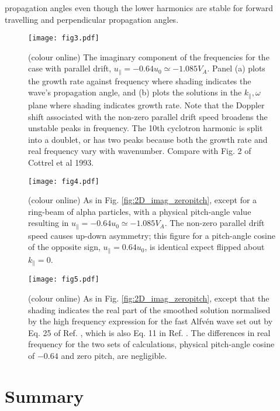 \documentclass[12pt]{iopart}
\begin{document}
propagation angles even though the lower harmonics are stable for forward travelling and perpendicular propagation angles.

\begin{figure}[ht!]
    \raggedleft
\texttt{[image: fig3.pdf]}
    \caption{(colour online) The imaginary component of the frequencies for the case with parallel drift, $u_{\parallel} = -0.64 u_0 \simeq -1.085 V_A$. Panel (a) plots the growth rate against frequency where shading indicates the wave's propagation angle, and (b) plots the solutions in the $k_\parallel, \omega$ plane where shading indicates growth rate. Note that the Doppler shift associated with the non-zero parallel drift speed broadens the unstable peaks in frequency. The 10th cyclotron harmonic is split into a doublet, or has two peaks because both the growth rate and real frequency vary with wavenumber. Compare with Fig. 2 of Cottrel et al 1993.}
    \label{fig:2D_F12_physicalpitch}
\end{figure}

\begin{figure}[ht!]
    \raggedleft
\texttt{[image: fig4.pdf]}
    \caption{(colour online) As in Fig. \ref{fig:2D_imag_zeropitch}, except for a ring-beam of alpha particles, with a physical pitch-angle value resulting in $u_{\parallel} = -0.64 u_0 \simeq -1.085 V_A$. The non-zero parallel drift speed causes up-down asymmetry; this figure for a pitch-angle cosine of the opposite sign, $u_{\parallel} = 0.64 u_0$, is identical expect flipped about $k_\parallel=0$.}
    \label{fig:2D_imag_physicalpitch}
\end{figure}


\begin{figure}[ht!]
    \raggedleft
\texttt{[image: fig5.pdf]}
    \caption{(colour online) As in Fig. \ref{fig:2D_imag_zeropitch}, except that the shading indicates the real part of the smoothed solution normalised by the high frequency expression for the fast Alfv{\'e}n wave set out by Eq. 25 of Ref. \cite{Dendy1994}, which is also Eq. 11 in Ref. \cite{McClements1996}. The differences in real frequency for the two sets of calculations, physical pitch-angle cosine of $-0.64$ and zero pitch, are negligible.}
    \label{fig:2D_real_zeropitch}
\end{figure}

\section{Summary}
\end{document}
